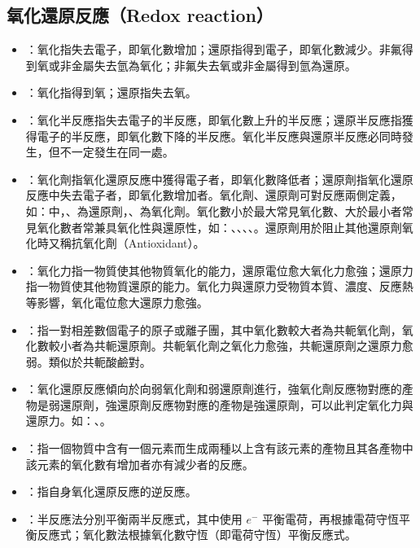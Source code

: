 \documentclass[a4paper,12pt]{article}
\begin{document}
\subsection{氧化還原反應（Redox reaction）}
\begin{itemize}
\item {}：氧化指失去電子，即氧化數增加；還原指得到電子，即氧化數減少。非氟得到氧或非金屬失去氫為氧化；非氟失去氧或非金屬得到氫為還原。
\item {}：氧化指得到氧；還原指失去氧。
\item {}：氧化半反應指失去電子的半反應，即氧化數上升的半反應；還原半反應指獲得電子的半反應，即氧化數下降的半反應。氧化半反應與還原半反應必同時發生，但不一定發生在同一處。
\item {}：氧化劑指氧化還原反應中獲得電子者，即氧化數降低者；還原劑指氧化還原反應中失去電子者，即氧化數增加者。氧化劑、還原劑可對反應兩側定義，如：中，、為還原劑，、為氧化劑。氧化數小於最大常見氧化數、大於最小者常見氧化數者常兼具氧化性與還原性，如：、、、、。還原劑用於阻止其他還原劑氧化時又稱抗氧化劑（Antioxidant）。
\item {}：氧化力指一物質使其他物質氧化的能力，還原電位愈大氧化力愈強；還原力指一物質使其他物質還原的能力。氧化力與還原力受物質本質、濃度、反應熱等影響，氧化電位愈大還原力愈強。
\item {}：指一對相差數個電子的原子或離子團，其中氧化數較大者為共軛氧化劑，氧化數較小者為共軛還原劑。共軛氧化劑之氧化力愈強，共軛還原劑之還原力愈弱。類似於共軛酸鹼對。
\item {}：氧化還原反應傾向於向弱氧化劑和弱還原劑進行，強氧化劑反應物對應的產物是弱還原劑，強還原劑反應物對應的產物是強還原劑，可以此判定氧化力與還原力。如：、。
\item {}：指一個物質中含有一個元素而生成兩種以上含有該元素的產物且其各產物中該元素的氧化數有增加者亦有減少者的反應。
\item {}：指自身氧化還原反應的逆反應。
\item {}：半反應法分別平衡兩半反應式，其中使用 $e^-$ 平衡電荷，再根據電荷守恆平衡反應式；氧化數法根據氧化數守恆（即電荷守恆）平衡反應式。
\end{itemize}
\end{document}
